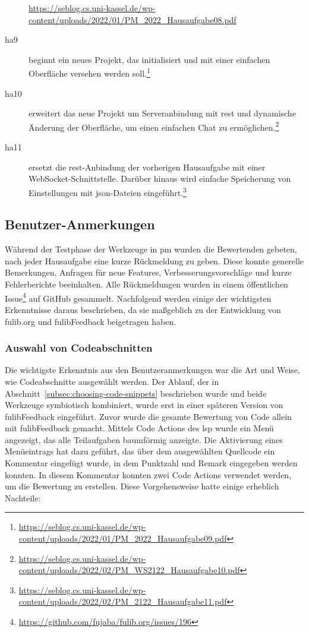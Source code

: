 \begin{description}
{        \url{https://seblog.cs.uni-kassel.de/wp-content/uploads/2022/01/PM_2022_Hausaufgabe08.pdf}
    }
    \item[\ac{ha}9] beginnt ein neues Projekt, das initialisiert und mit einer einfachen Oberfläche versehen werden soll.\footnote{
        \url{https://seblog.cs.uni-kassel.de/wp-content/uploads/2022/01/PM_2022_Hausaufgabe09.pdf}
    }
    \item[\ac{ha}10] erweitert das neue Projekt um Serveranbindung mit \ac{rest} und dynamische Änderung der Oberfläche, um einen einfachen Chat zu ermöglichen.\footnote{
        \url{https://seblog.cs.uni-kassel.de/wp-content/uploads/2022/02/PM_WS2122_Hausaufgabe10.pdf}
    }
    \item[\ac{ha}11] ersetzt die \ac{rest}-Anbindung der vorherigen Hausaufgabe mit einer WebSocket-Schnittstelle.
    Darüber hinaus wird einfache Speicherung von Einstellungen mit \ac{json}-Dateien eingeführt.\footnote{
        \url{https://seblog.cs.uni-kassel.de/wp-content/uploads/2022/02/PM_2122_Hausaufgabe11.pdf}
    }
\end{description}

\subsection{Benutzer-Anmerkungen}\label{subsec:user-feedback}

Während der Testphase der Werkzeuge in \ac{pm} wurden die Bewertenden gebeten, nach jeder Hausaufgabe eine kurze Rückmeldung zu geben.
Diese konnte generelle Bemerkungen, Anfragen für neue Features, Verbesserungsvorschläge und kurze Fehlerberichte beeinhalten.
Alle Rückmeldungen wurden in einem öffentlichen Issue\footnote{
    \url{https://github.com/fujaba/fulib.org/issues/196}
} auf GitHub gesammelt.
Nachfolgend werden einige der wichtigsten Erkenntnisse daraus beschrieben, da sie maßgeblich zu der Entwicklung von fulib.org und fulibFeedback beigetragen haben.

\subsubsection{Auswahl von Codeabschnitten}

Die wichtigste Erkenntnis aus den Benutzeranmerkungen war die Art und Weise, wie Codeabschnitte ausgewählt werden.
Der Ablauf, der in Abschnitt~\ref{subsec:choosing-code-snippets} beschrieben wurde und beide Werkzeuge symbiotisch kombiniert, wurde erst in einer späteren Version von fulibFeedback eingeführt.
Zuvor wurde die gesamte Bewertung von Code allein mit fulibFeedback gemacht.
Mittels Code Actions des \ac{lsp} wurde ein Menü angezeigt, das alle Teilaufgaben baumförmig anzeigte.
Die Aktivierung eines Menüeintrags hat dazu geführt, das über dem ausgewählten Quellcode ein Kommentar eingefügt wurde, in dem Punktzahl und Remark eingegeben werden konnten.
In diesem Kommentar konnten zwei Code Actions verwendet werden, um die Bewertung zu erstellen.
Diese Vorgehensweise hatte einige erheblich Nachteile:

